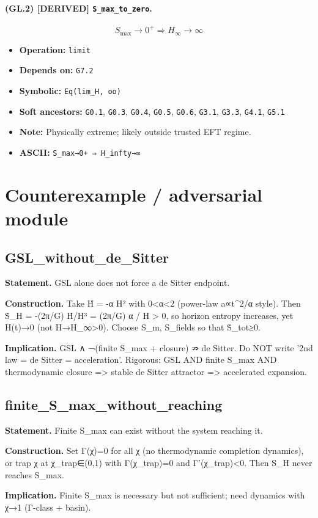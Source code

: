 \documentclass[11pt,a4paper]{article}
\theoremstyle{remark}\newtheorem*{caution}{Caution}
\newcommand{\tagbox}[1]{\textsc{[#1]}}
\begin{document}
\paragraph{(GL.2) \tagbox{DERIVED} \texttt{S\_max\_to\_zero}.}
\begin{equation}
S_{\max}\to 0^+\Rightarrow H_\infty\to\infty
\tag{GL.2}
\end{equation}
\begin{itemize}\setlength{\itemsep}{0.12em}
\item \textbf{Operation:} \texttt{limit}
\item \textbf{Depends on:} \texttt{G7.2}
\item \textbf{Symbolic:} \texttt{Eq(lim\_H, oo)}
\item \textbf{Soft ancestors:} \texttt{G0.1}, \texttt{G0.3}, \texttt{G0.4}, \texttt{G0.5}, \texttt{G0.6}, \texttt{G3.1}, \texttt{G3.3}, \texttt{G4.1}, \texttt{G5.1}
\item \textbf{Note:} Physically extreme; likely outside trusted EFT regime.
\item \textbf{ASCII:} \texttt{S\_max→0+ ⇒ H\_infty→∞}
\end{itemize}
\section{Counterexample / adversarial module}
\subsection{GSL\_without\_de\_Sitter}
\textbf{Statement.} GSL alone does not force a de Sitter endpoint.
\par\textbf{Construction.} Take Ḣ = -α H² with 0<α<2 (power-law a∝t^{2/α} style). Then Ṡ\_H = -(2π/G) Ḣ/H³ = (2π/G) α / H > 0, so horizon entropy increases, yet H(t)→0 (not H→H\_∞>0). Choose S\_m, S\_fields so that Ṡ\_tot≥0.
\par\textbf{Implication.} GSL ∧ ¬(finite S\_max + closure) ⇏ de Sitter. Do NOT write '2nd law = de Sitter = acceleration'. Rigorous: GSL AND finite S\_max AND thermodynamic closure => stable de Sitter attractor => accelerated expansion.
\subsection{finite\_S\_max\_without\_reaching}
\textbf{Statement.} Finite S\_max can exist without the system reaching it.
\par\textbf{Construction.} Set Γ(χ)=0 for all χ (no thermodynamic completion dynamics), or trap χ at χ\_trap∈(0,1) with Γ(χ\_trap)=0 and Γ'(χ\_trap)<0. Then S\_H never reaches S\_max.
\par\textbf{Implication.} Finite S\_max is necessary but not sufficient; need dynamics with χ→1 (Γ-class + basin).
\end{document}
